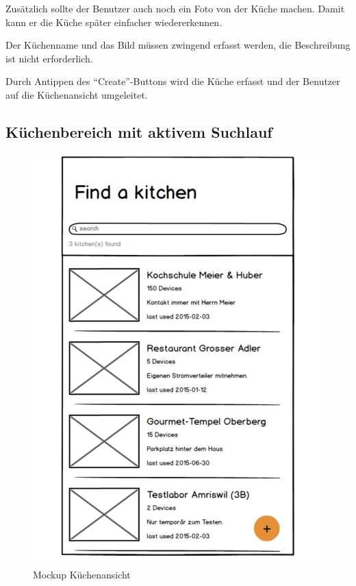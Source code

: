 Zusätzlich sollte der Benutzer auch noch ein Foto von der Küche machen. Damit kann er die Küche später einfacher wiedererkennen.

Der Küchenname und das Bild müssen zwingend erfasst werden, die Beschreibung ist nicht erforderlich.

Durch Antippen des \enquote{Create}-Buttons wird die Küche erfasst und der Benutzer auf die Küchenansicht umgeleitet.

\subsection{Küchenbereich mit aktivem Suchlauf}
\label{subsec:Küchenbereich mit aktivem Suchlauf}

\begin{figure}
	\includegraphics[page=4,trim=0 0 0 0,clip,scale=0.21]{uiux/res/mockups}
	\caption{Mockup Küchenansicht}
    \label{abb:mockKitchenView}
\end{figure}

